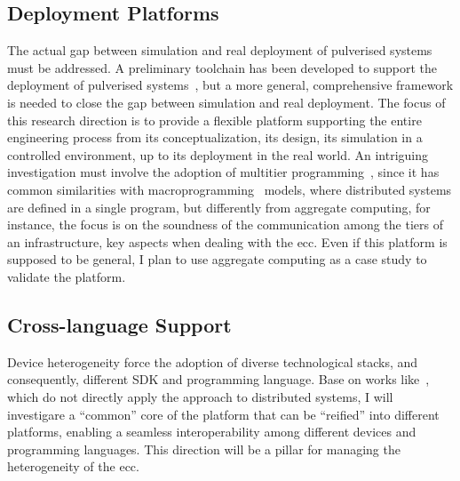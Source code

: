 \documentclass[runningheads]{llncs}
\begin{document}
\subsection{Deployment Platforms}
The actual gap between simulation and real deployment of pulverised systems must be addressed.
%
A preliminary toolchain has been developed to support the deployment of pulverised systems~\cite{DBLP:journals/fgcs/FarabegoliPCV24,DBLP:conf/acsos/FarabegoliVC24},
but a more general,
comprehensive framework is needed to close the gap between simulation and real deployment.
%
The focus of this research direction is to provide a
flexible platform supporting the entire engineering process from its conceptualization,
its design,
its simulation in a controlled environment,
up to its deployment in the real world.
%
An intriguing investigation must involve the adoption of multitier programming~\cite{DBLP:journals/pacmpl/WeisenburgerKS18},
since it has common similarities with macroprogramming~\cite{DBLP:journals/csur/Casadei23} models,
where distributed systems are defined in a single program,
but differently from aggregate computing,
for instance,
the focus is on the soundness of the communication among the tiers of an infrastructure,
key aspects when dealing with the \ac{ecc}.
%
Even if this platform is supposed to be general,
I plan to use aggregate computing as a case study to validate the platform.

\subsection{Cross-language Support}
Device heterogeneity force the adoption of diverse technological stacks,
and consequently,
different SDK and programming language.
%
Base on works like~\cite{DBLP:journals/jss/BertolottiCOC24},
which do not directly apply the approach to distributed systems,
I will investigare a ``common'' core of the platform that can be ``reified'' into different platforms,
enabling a seamless interoperability among different devices and programming languages.
%
This direction will be a pillar for managing the heterogeneity of the \ac{ecc}.
\end{document}
